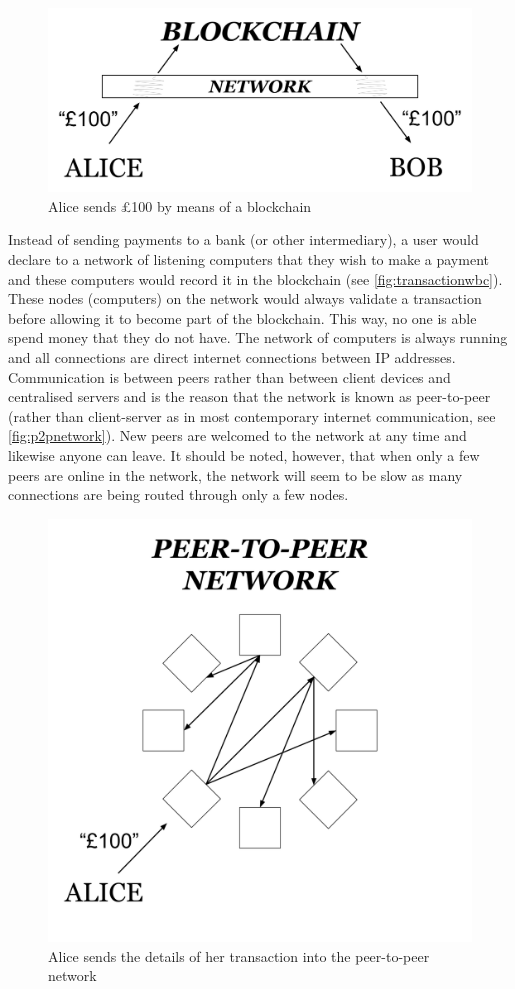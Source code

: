 \documentclass{article}
\begin{document}
\begin{figure}[h]
    \centering
    \includegraphics[width=0.65\linewidth]{Images/Diagrams/transaction_with_blockchain.png}
    \caption{Alice sends £100 by means of a blockchain}
    \label{fig:transactionwbc}
\end{figure}
Instead of sending payments to a bank (or other intermediary), a user would declare to a network of listening computers that they wish to make a payment and these computers would record it in the blockchain (see \autoref{fig:transactionwbc}).
These nodes (computers) on the network would always validate a transaction before allowing it to become part of the blockchain. This way, no one is able spend money that they do not have. The network of computers is always running and all connections are direct internet connections between IP addresses. 
Communication is between peers rather than between client devices and centralised servers and is the reason that the network is known as peer-to-peer (rather than client-server as in most contemporary internet communication, see \autoref{fig:p2pnetwork}). New peers are welcomed to the network at any time and likewise anyone can leave. It should be noted, however, that when only a few peers are online in the network, the network will seem to be slow as many connections are being routed through only a few nodes.
\begin{figure}
    \centering
    \includegraphics[width=0.5\linewidth]{Images/Diagrams/p2p_network.png}
    \caption{Alice sends the details of her transaction into the peer-to-peer network}
    \label{fig:p2pnetwork}
\end{figure}
\end{document}
